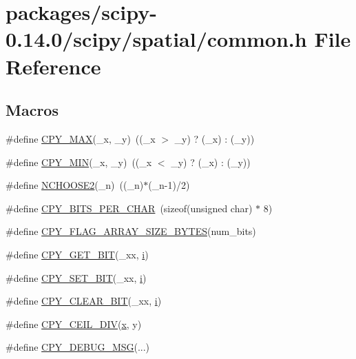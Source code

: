 \hypertarget{scipy-0_814_80_2scipy_2spatial_2common_8h}{}\section{packages/scipy-\/0.14.0/scipy/spatial/common.h File Reference}
\label{scipy-0_814_80_2scipy_2spatial_2common_8h}
\subsection*{Macros}
\begin{DoxyCompactItemize}
\item 
\#define \hyperlink{scipy-0_814_80_2scipy_2spatial_2common_8h_a9711354dd174700495172b2704e15264}{C\+P\+Y\+\_\+\+M\+A\+X}(\+\_\+x,  \+\_\+y)~((\+\_\+x $>$ \+\_\+y) ? (\+\_\+x) \+: (\+\_\+y))
\item 
\#define \hyperlink{scipy-0_814_80_2scipy_2spatial_2common_8h_a854cb1cc38fe7c993ba776d0abf73c0a}{C\+P\+Y\+\_\+\+M\+I\+N}(\+\_\+x,  \+\_\+y)~((\+\_\+x $<$ \+\_\+y) ? (\+\_\+x) \+: (\+\_\+y))
\item 
\#define \hyperlink{scipy-0_814_80_2scipy_2spatial_2common_8h_abb718fbcba05766b98797bc0c8679392}{N\+C\+H\+O\+O\+S\+E2}(\+\_\+n)~((\+\_\+n)$\ast$(\+\_\+n-\/1)/2)
\item 
\#define \hyperlink{scipy-0_814_80_2scipy_2spatial_2common_8h_a8e59f30d1b6f8530e3583cb8ceea23e6}{C\+P\+Y\+\_\+\+B\+I\+T\+S\+\_\+\+P\+E\+R\+\_\+\+C\+H\+A\+R}~(sizeof(unsigned char) $\ast$ 8)
\item 
\#define \hyperlink{scipy-0_814_80_2scipy_2spatial_2common_8h_a79af9b0841bc1859896cfb0d7decc7ab}{C\+P\+Y\+\_\+\+F\+L\+A\+G\+\_\+\+A\+R\+R\+A\+Y\+\_\+\+S\+I\+Z\+E\+\_\+\+B\+Y\+T\+E\+S}(num\+\_\+bits)
\item 
\#define \hyperlink{scipy-0_814_80_2scipy_2spatial_2common_8h_abbd3845f780999643f7befd2710dfa95}{C\+P\+Y\+\_\+\+G\+E\+T\+\_\+\+B\+I\+T}(\+\_\+xx,  \hyperlink{indexexpr_8h_aabd77643995707c185e95c8cb2782c81}{i})
\item 
\#define \hyperlink{scipy-0_814_80_2scipy_2spatial_2common_8h_a8276cf81605493e8880428a02b7f1801}{C\+P\+Y\+\_\+\+S\+E\+T\+\_\+\+B\+I\+T}(\+\_\+xx,  \hyperlink{indexexpr_8h_aabd77643995707c185e95c8cb2782c81}{i})
\item 
\#define \hyperlink{scipy-0_814_80_2scipy_2spatial_2common_8h_ab110690450f26f45b9a1592583710081}{C\+P\+Y\+\_\+\+C\+L\+E\+A\+R\+\_\+\+B\+I\+T}(\+\_\+xx,  \hyperlink{indexexpr_8h_aabd77643995707c185e95c8cb2782c81}{i})
\item 
\#define \hyperlink{scipy-0_814_80_2scipy_2spatial_2common_8h_a5bc06e1af1a2b4e87d1fbab392a53caf}{C\+P\+Y\+\_\+\+C\+E\+I\+L\+\_\+\+D\+I\+V}(\hyperlink{vecnorm1_8cc_ac73eed9e41ec09d58f112f06c2d6cb63}{x},  y)
\item 
\#define \hyperlink{scipy-0_814_80_2scipy_2spatial_2common_8h_adab9f9bba3002510208e9330da07c66c}{C\+P\+Y\+\_\+\+D\+E\+B\+U\+G\+\_\+\+M\+S\+G}(...)
\end{DoxyCompactItemize}


